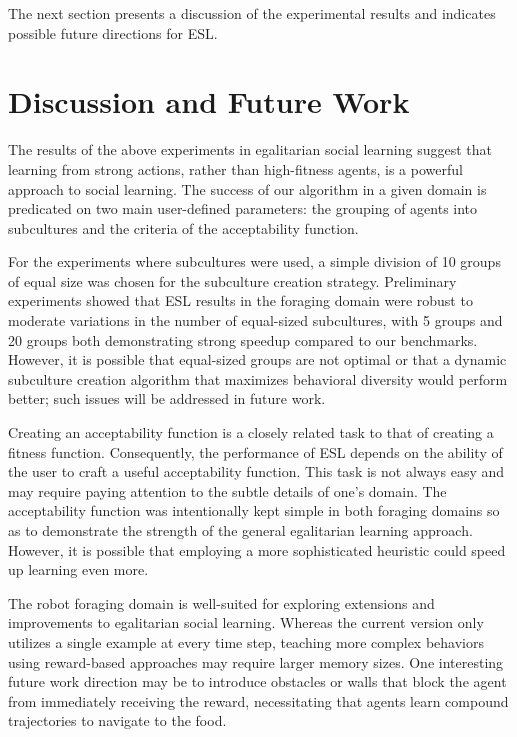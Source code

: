 \documentclass{sig-alternate}
\begin{document}
The next section presents a discussion of the experimental results and indicates possible future directions for ESL.

\section{Discussion and Future Work}
\label{sec:future}
The results of the above experiments in egalitarian social learning suggest that learning from strong actions, rather than high-fitness agents, is a powerful approach to social learning. The success of our algorithm in a given domain is predicated on two main user-defined parameters: the grouping of agents into subcultures and the criteria of the acceptability function.

For the experiments where subcultures were used, a simple division of 10 groups of equal size was chosen for the subculture creation strategy. Preliminary experiments showed that ESL results in the foraging domain were robust to moderate variations in the number of equal-sized subcultures, with 5 groups and 20 groups both demonstrating strong speedup compared to our benchmarks. However, it is possible that equal-sized groups are not optimal or that a dynamic subculture creation algorithm that maximizes behavioral diversity would perform better; such issues will be addressed in future work.

Creating an acceptability function is a closely related task to that of creating a fitness function. Consequently, the performance of ESL depends on the ability of the user to craft a useful acceptability function. This task is not always easy and may require paying attention to the subtle details of one's domain. The acceptability function was intentionally kept simple in both foraging domains so as to demonstrate the strength of the general egalitarian learning approach. However, it is possible that employing a more sophisticated heuristic could speed up learning even more.

The robot foraging domain is well-suited for exploring extensions and improvements to egalitarian social learning. Whereas the current version only utilizes a single example at every time step, teaching more complex behaviors using reward-based approaches may require larger memory sizes. One interesting future work direction may be to introduce obstacles or walls that block the agent from immediately receiving the reward, necessitating that agents learn compound trajectories to navigate to the food.
\end{document}
